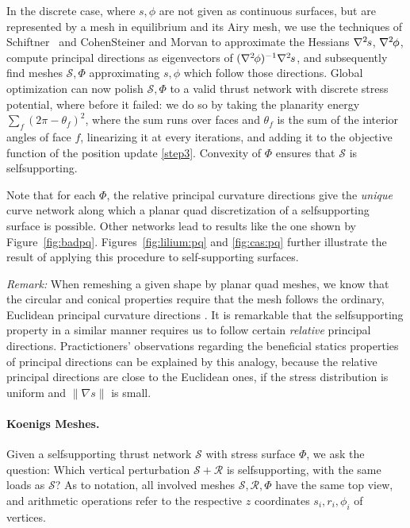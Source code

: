 \documentclass[review]{acmsiggraph}
\def\ess{s}
\def\Hess#1{{\def\testess{#1}\nabla^2\ifx\testess\ess\!s\else #1\fi}}
\def\Hess#1{\text{$\nabla^2\hskip-.2ex #1$}}
\def\SS{{\mathcal S}}
\def\RR{{\mathcal R}}
\begin{document}
In the discrete case, where $s,\phi$ are not given as continuous surfaces, 
but are represented by a mesh in equilibrium and its Airy mesh, we use the 
techniques of Schiftner~ and Cohen\dash Steiner 
and Morvan  to approximate the Hessians 
$\Hess s$, $\Hess\phi$, compute principal directions as eigenvectors of 
$(\Hess\phi)^{-1}\Hess s$, and subsequently find meshes $\SS,\Phi$ 
approximating $s,\phi$ which follow those directions. Global optimization 
can now polish $\SS,\Phi$ to a valid thrust network with discrete stress 
potential, where before it failed: we do so by taking the planarity energy
$\sum_f (2\pi - \theta_f)^2$, where the sum runs over faces and $\theta_f$ is the
sum of the interior angles of face $f$, linearizing it at every iterations, and
adding it to the objective function of the position update \ref{step3}.
Convexity of $\Phi$ ensures that $\SS$ is self\dash supporting. 


Note that for each $\Phi$, the relative principal curvature directions give the 
\emph{unique} curve network along which a planar quad discretization of a 
self\dash supporting surface is possible. Other networks lead to results
like the one shown by Figure~\ref{fig:badpq}.
Figures~\ref{fig:lilium:pq} and \ref{fig:cas:pq} 
further illustrate the result of applying this procedure to 
self-supporting surfaces.




{\em Remark:} When remeshing a given shape by planar quad meshes, we know
that the circular and conical properties require that the mesh follows the
ordinary, Euclidean principal curvature directions \cite{Liu2006}. It is
remarkable that the self\dash supporting property in a similar manner
requires us to follow certain {\em relative} principal directions.
Practictioners' observations regarding the beneficial statics properties
of principal directions can be explained by this analogy, because the
relative principal directions are close to the Euclidean ones, if the
stress distribution is uniform and $\|\nabla s\|$ is small.



\paragraph{Koenigs Meshes.}

Given a self\dash supporting thrust network $\SS$ with stress surface
$\Phi$, we ask the question:
Which vertical perturbation $\SS+\RR$ is self\dash supporting, with the same
loads as $\SS$? As to notation, all involved meshes $\SS,\RR,\Phi$ have the
same top view, and arithmetic operations refer to the respective $z$
coordinates
$s_i,r_i,\phi_i$ of vertices.
\end{document}
